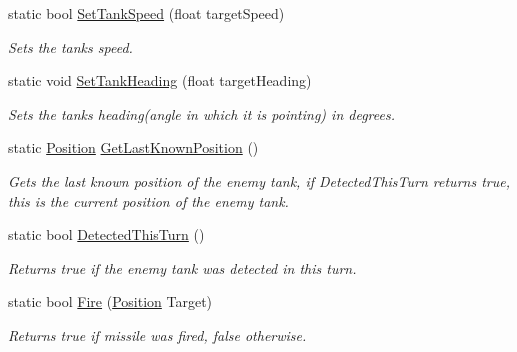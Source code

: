 \begin{DoxyCompactItemize}
static bool \hyperlink{class_n_g_a_p_i_1_1_a_p_i_a44b396868d10d6182bca1b11fc1e0f65}{Set\+Tank\+Speed} (float target\+Speed)
\begin{DoxyCompactList}\small\item\em Sets the tank\textquotesingle{}s speed. \end{DoxyCompactList}\item 
static void \hyperlink{class_n_g_a_p_i_1_1_a_p_i_a7bb4fcbbc23b3f95f372c7276c92386e}{Set\+Tank\+Heading} (float target\+Heading)
\begin{DoxyCompactList}\small\item\em Sets the tank\textquotesingle{}s heading(angle in which it is pointing) in degrees. \end{DoxyCompactList}\item 
\mbox{\label{class_n_g_a_p_i_1_1_a_p_i_adc594148535af505350268bbd5d45ddd}} 
static \hyperlink{struct_n_g_a_p_i_1_1_position}{Position} \hyperlink{class_n_g_a_p_i_1_1_a_p_i_adc594148535af505350268bbd5d45ddd}{Get\+Last\+Known\+Position} ()
\begin{DoxyCompactList}\small\item\em Gets the last known position of the enemy tank, if Detected\+This\+Turn returns true, this is the current position of the enemy tank. \end{DoxyCompactList}\item 
\mbox{\label{class_n_g_a_p_i_1_1_a_p_i_af73a1808cf1466afcf29262f78a2fa8c}} 
static bool \hyperlink{class_n_g_a_p_i_1_1_a_p_i_af73a1808cf1466afcf29262f78a2fa8c}{Detected\+This\+Turn} ()
\begin{DoxyCompactList}\small\item\em Returns true if the enemy tank was detected in this turn. \end{DoxyCompactList}\item 
\mbox{\label{class_n_g_a_p_i_1_1_a_p_i_adadc36796b61c7963e8bf9c16a81efb6}} 
static bool \hyperlink{class_n_g_a_p_i_1_1_a_p_i_adadc36796b61c7963e8bf9c16a81efb6}{Fire} (\hyperlink{struct_n_g_a_p_i_1_1_position}{Position} Target)
\begin{DoxyCompactList}\small\item\em Returns true if missile was fired, false otherwise. \end{DoxyCompactList}\item 

\end{DoxyCompactItemize}
